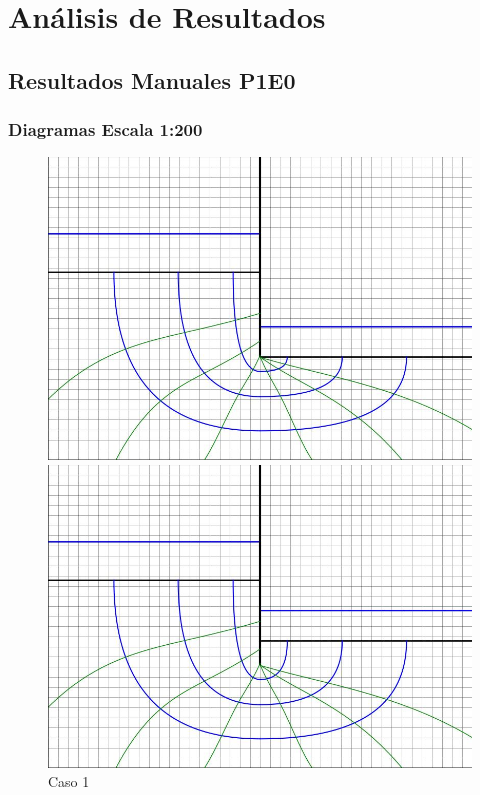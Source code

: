 \section{Análisis de Resultados}

\subsection{Resultados Manuales P1E0}

\subsubsection{Diagramas Escala 1:200}

\begin{figure}[H]
    \centering
    \begin{minipage}{0.32\textwidth}
        \centering
        \includegraphics[width=\textwidth]{GRAFICOS/caso_1.jpg}
        \caption{Caso 1}
    \end{minipage}
    \begin{minipage}{0.32\textwidth}
        \centering
        \includegraphics[width=\textwidth]{GRAFICOS/caso_2.jpg}

\end{minipage}
\end{figure}
